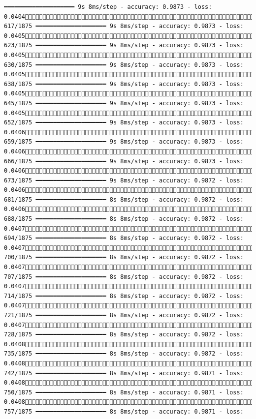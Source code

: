 \documentclass[
  letterpaper,
  DIV=11,
  numbers=noendperiod]{scrreprt}
\begin{document}
\begin{verbatim}
━━━━━━━━━━━━━━━━━━━━ 9s 8ms/step - accuracy: 0.9873 - loss: 0.0404 617/1875 ━━━━━━━━━━━━━━━━━━━━ 9s 8ms/step - accuracy: 0.9873 - loss: 0.0405 623/1875 ━━━━━━━━━━━━━━━━━━━━ 9s 8ms/step - accuracy: 0.9873 - loss: 0.0405 630/1875 ━━━━━━━━━━━━━━━━━━━━ 9s 8ms/step - accuracy: 0.9873 - loss: 0.0405 638/1875 ━━━━━━━━━━━━━━━━━━━━ 9s 8ms/step - accuracy: 0.9873 - loss: 0.0405 645/1875 ━━━━━━━━━━━━━━━━━━━━ 9s 8ms/step - accuracy: 0.9873 - loss: 0.0405 652/1875 ━━━━━━━━━━━━━━━━━━━━ 9s 8ms/step - accuracy: 0.9873 - loss: 0.0406 659/1875 ━━━━━━━━━━━━━━━━━━━━ 9s 8ms/step - accuracy: 0.9873 - loss: 0.0406 666/1875 ━━━━━━━━━━━━━━━━━━━━ 9s 8ms/step - accuracy: 0.9873 - loss: 0.0406 673/1875 ━━━━━━━━━━━━━━━━━━━━ 9s 8ms/step - accuracy: 0.9872 - loss: 0.0406 681/1875 ━━━━━━━━━━━━━━━━━━━━ 8s 8ms/step - accuracy: 0.9872 - loss: 0.0406 688/1875 ━━━━━━━━━━━━━━━━━━━━ 8s 8ms/step - accuracy: 0.9872 - loss: 0.0407 694/1875 ━━━━━━━━━━━━━━━━━━━━ 8s 8ms/step - accuracy: 0.9872 - loss: 0.0407 700/1875 ━━━━━━━━━━━━━━━━━━━━ 8s 8ms/step - accuracy: 0.9872 - loss: 0.0407 707/1875 ━━━━━━━━━━━━━━━━━━━━ 8s 8ms/step - accuracy: 0.9872 - loss: 0.0407 714/1875 ━━━━━━━━━━━━━━━━━━━━ 8s 8ms/step - accuracy: 0.9872 - loss: 0.0407 721/1875 ━━━━━━━━━━━━━━━━━━━━ 8s 8ms/step - accuracy: 0.9872 - loss: 0.0407 728/1875 ━━━━━━━━━━━━━━━━━━━━ 8s 8ms/step - accuracy: 0.9872 - loss: 0.0408 735/1875 ━━━━━━━━━━━━━━━━━━━━ 8s 8ms/step - accuracy: 0.9872 - loss: 0.0408 742/1875 ━━━━━━━━━━━━━━━━━━━━ 8s 8ms/step - accuracy: 0.9871 - loss: 0.0408 750/1875 ━━━━━━━━━━━━━━━━━━━━ 8s 8ms/step - accuracy: 0.9871 - loss: 0.0408 757/1875 ━━━━━━━━━━━━━━━━━━━━ 8s 8ms/step - accuracy: 0.9871 - loss: 
\end{verbatim}
\end{document}
